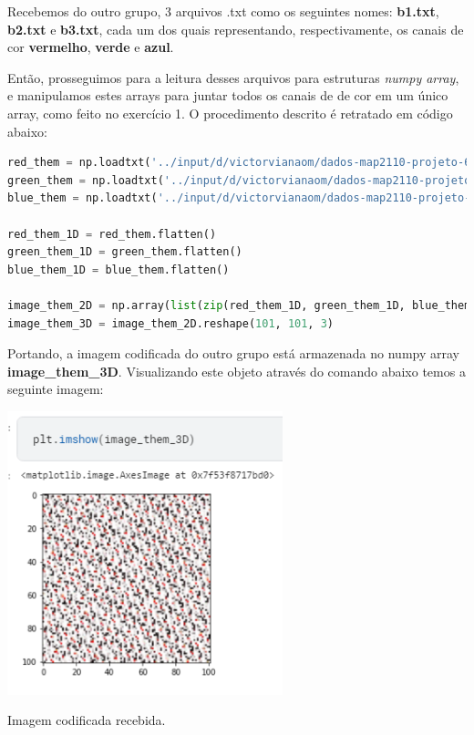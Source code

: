 \documentclass[a4paper, 12pt]{article}
\begin{document}
Recebemos do outro grupo, 3 arquivos .txt como os seguintes nomes: \textbf{b1.txt}, \textbf{b2.txt} e \textbf{b3.txt}, cada um dos quais representando, respectivamente, os canais de cor \textbf{vermelho}, \textbf{verde} e \textbf{azul}.

Então, prosseguimos para a leitura desses arquivos para estruturas \textit{numpy array}, e manipulamos estes arrays para juntar todos os canais de de cor em um único array, como feito no exercício 1. O procedimento descrito é retratado em código abaixo:

\begin{lstlisting}[language=Python, caption = Lendo dos arquivos .txt e armazenando em estruturas numpy array ]
red_them = np.loadtxt('../input/d/victorvianaom/dados-map2110-projeto-6-caos/b1.txt', delimiter=' ')
green_them = np.loadtxt('../input/d/victorvianaom/dados-map2110-projeto-6-caos/b2.txt', delimiter=' ')
blue_them = np.loadtxt('../input/d/victorvianaom/dados-map2110-projeto-6-caos/b3.txt', delimiter=' ')

red_them_1D = red_them.flatten()
green_them_1D = green_them.flatten()
blue_them_1D = blue_them.flatten()

image_them_2D = np.array(list(zip(red_them_1D, green_them_1D, blue_them_1D)))
image_them_3D = image_them_2D.reshape(101, 101, 3)
\end{lstlisting}

Portando, a imagem codificada do outro grupo está armazenada no numpy array \textbf{image\_them\_3D}. Visualizando este objeto através do comando abaixo temos a seguinte imagem:

\begin{center}
    \includegraphics[width=8cm]{03_image_them_plot.PNG}
    
    Imagem codificada recebida.
\end{center}
\end{document}
